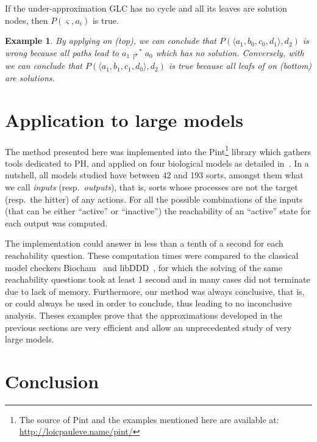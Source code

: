 \documentclass{movep}
\def\pref{\prettyref}
\newtheorem*{example*}{Example}{\itshape}{}
\newcommand{\PHfrappeB}{\Rsh}
\newcommand{\PHobjectif}[2]{\mbox{$#1\PHfrappeB^*\!#2$}}
\newcommand{\PHobj}{\PHobjectif}
\def\ctx{\varsigma}
\newcommand{\Pcai}{P(\ctx, a_i)}
\newcommand{\PHetat}[1]{\mbox{$\langle #1 \rangle$}}
\def\ctx{\varsigma}
\newcounter{la}
\newcommand{\resp}{resp.\ }
\begin{document}
\begin{theorem}
\label{th:ua}
  If the under-approximation GLC has no cycle and all its leaves are solution nodes,
  then $\Pcai$ is true.
\end{theorem}

\begin{example*}
  By applying \pref{th:oa} on \pref{fig:glc}(top),
  we can conclude that $P(\PHetat{a_1,b_0,c_0,d_1}, d_2)$ is wrong
  because all paths lead to $\PHobj{a_1}{a_0}$ which has no solution.
  Conversely, with \pref{th:ua} we can conclude that
  $P(\PHetat{a_1,b_1,c_1,d_0}, d_2)$ is true
  because all leafs of on \pref{fig:glc}(bottom) are solutions.
\end{example*}




\section{Application to large models}
\label{sec:examples}

The method presented here was implemented into the
Pint\footnote{The source of Pint and the examples mentioned here are available at:
\url{http://loicpauleve.name/pint/}}
library which gathers tools dedicated to PH, and
applied on four biological models as detailed in~\cite{PMR12-MSCS}.
In a nutshell, all models studied have between 42 and 193 sorts,
amongst them what we call \emph{inputs} (\resp \emph{outputs}),
that is, sorts whose processes are not the target (\resp the hitter) of any actions.
For all the possible combinations of the inputs
(that can be either “active” or “inactive”)
the reachability of an “active” state for each output was computed.

The implementation could answer in less than a tenth of a second for each
reachability question.
These computation times were compared to the classical model checkers Biocham~\cite{fages2008formal}
and libDDD~\cite{couvreur2002data}, for which the solving of the same reachability questions
took at least 1 second and in many cases did not terminate due to lack of memory.
Furthermore, our method was always conclusive,
that is, \pref{th:oa} or \pref{th:ua} could always be used in order to conclude,
thus leading to no inconclusive analysis.
Theses examples prove that the approximations developed in the previous sections are very efficient
and allow an unprecedented study of very large models.



\section{Conclusion}
\label{sec:conclusion}
\end{document}
